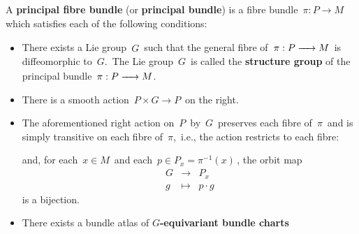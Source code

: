 \vskip 0.5cm
\begin{definition}
\mbox{}
\vskip 0.1cm
\noindent
A \textbf{principal fibre bundle} (or \textbf{principal bundle}) is a fibre bundle
\,$\pi : P \longrightarrow M$\,
which satisfies each of the following conditions:
\begin{itemize}
\item
	There exists a Lie group \,$G$\, such that
	the general fibre of
	\,$\pi : P \xrightarrow{{\color{white}222}} M$\,
	is diffeomorphic to \,$G$.\,
	The Lie group \,$G$\, is called the \textbf{structure group} of the principal bundle
	\,$\pi : P \xrightarrow{{\color{white}222}} M$.\,
	\begin{center}
	\end{center}
\item
	There is a smooth action
	\,$P \times G \longrightarrow P$\,
	on the right.
\item
	The aforementioned right action on \,$P$\, by \,$G$\,
	preserves each fibre of \,$\pi$\,
	and is simply transitive on each fibre of \,$\pi$,\,
	i.e., the action restricts to each fibre:
	\begin{center}
	\end{center}
	and, for each \,$x \in M$\, and each \,$p \in P_{x} = \pi^{-1}(x)$\,,
	the orbit map
	\begin{equation*}
	\begin{array}{ccc}
	G & \longrightarrow & P_{x}
	\\
	g & \longmapsto & p \cdot g
	\end{array}
	\end{equation*}
	is a bijection.
\item
	There exists a bundle atlas of \textbf{$G$-equivariant bundle charts}

\end{itemize}
\end{definition}
